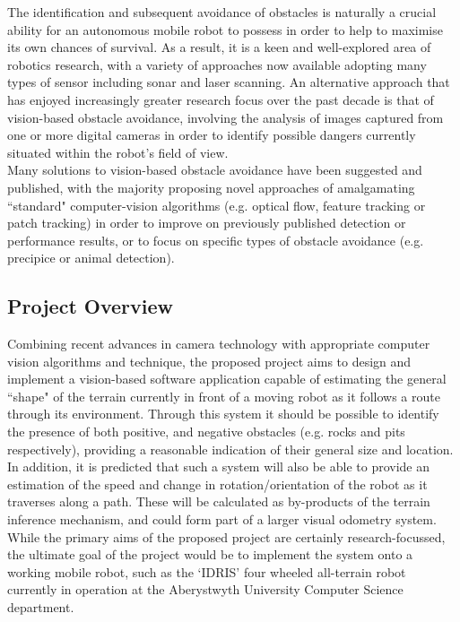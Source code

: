 \documentclass[10pt,fleqn,twoside]{article}
\begin{document}
The identification and subsequent avoidance of obstacles is naturally a crucial ability for an autonomous mobile robot to possess in order to help to maximise its own chances of survival. As a result, it is a keen and well-explored area of robotics research, with a variety of approaches now available adopting many types of sensor including sonar and laser scanning. An alternative approach that has enjoyed increasingly greater research focus over the past decade is that of vision-based obstacle avoidance, involving the analysis of images captured from one or more digital cameras in order to identify possible dangers currently situated within the robot's field of view. \\

Many solutions to vision-based obstacle avoidance have been suggested and published, with the majority proposing novel approaches of amalgamating ``standard" computer-vision algorithms (e.g. optical flow, feature tracking or patch tracking) in order to improve on previously published detection or performance results, or to focus on specific types of obstacle avoidance (e.g. precipice or animal detection).

\subsection{Project Overview}

Combining recent advances in camera technology with appropriate computer vision algorithms and technique, the proposed project aims to design and implement a vision-based software application capable of estimating the general ``shape" of the terrain currently in front of a moving robot as it follows a route through its environment. Through this system it should be possible to identify the presence of both positive, and negative obstacles (e.g. rocks and pits respectively), providing a reasonable indication of their general size and location. \\

In addition, it is predicted that such a system will also be able to provide an estimation of the speed and change in rotation/orientation of the robot as it traverses along a path. These will be calculated as by-products of the terrain inference mechanism, and could form part of a larger visual odometry system. \\

While the primary aims of the proposed project are certainly research-focussed, the ultimate goal of the project would be to implement the system onto a working mobile robot, such as the `IDRIS' four wheeled all-terrain robot currently in operation at the Aberystwyth University Computer Science department. \\
\end{document}

